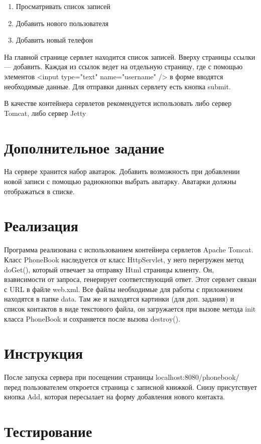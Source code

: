 \documentclass{article}
\begin{document}
\begin{enumerate}
	\item Просматривать список записей
	\item Добавить нового пользователя
	\item Добавить новый телефон

\end{enumerate}

На главной странице сервлет находится список записей. Вверху страницы ссылки --- добавить. Каждая из ссылок ведет на отдельную страницу, где с помощью элементов <input type="text" name="username" /> в форме вводятся необходимые данные. Для отправки данных сервлету есть кнопка submit. 

В качестве контейнера сервлетов рекомендуется использовать либо сервер Tomcat, либо сервер Jetty

\section{Дополнительное задание}
На сервере хранится набор аватарок. Добавить возможность при добавлении новой записи с помощью радиокнопки выбрать аватарку. Аватарки должны отображаться в списке.

\section{Реализация}
Программа реализована с использованием контейнера сервлетов Apache Tomcat.
Класс PhoneBook наследуется от класс HttpServlet, у него перегружен метод doGet(), который отвечает за отправку Html страницы клиенту. Он, взависимости от запроса, генерирует соответствующий ответ. Этот сервлет связан с URL в файле web.xml. 
Все файлы необходимые для работы с приложением находятся в папке data. Там же и находятся картинки (для доп. задания) и список контактов в виде текстового файла, он загружается при вызове метода init класса PhoneBook и сохраняется после вызова destroy().

\section{Инструкция}
После запуска сервера при посещении страницы localhost:8080/phonebook/ перед пользователем откроется страница с записной книжкой. Снизу присутствует кнопка Add, которая пересылает на форму добавления нового контакта. 
\section{Тестирование}
\end{document}
